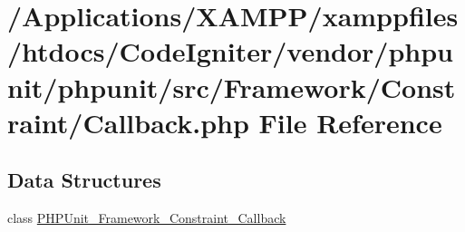 \hypertarget{_callback_8php}{}\section{/\+Applications/\+X\+A\+M\+P\+P/xamppfiles/htdocs/\+Code\+Igniter/vendor/phpunit/phpunit/src/\+Framework/\+Constraint/\+Callback.php File Reference}
\label{_callback_8php}
\subsection*{Data Structures}
\begin{DoxyCompactItemize}
\item 
class \mbox{\hyperlink{class_p_h_p_unit___framework___constraint___callback}{P\+H\+P\+Unit\+\_\+\+Framework\+\_\+\+Constraint\+\_\+\+Callback}}
\end{DoxyCompactItemize}
